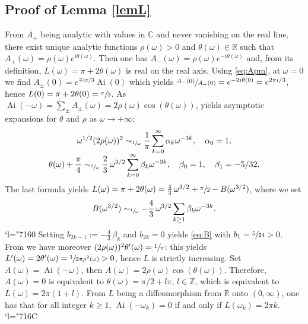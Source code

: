 \documentclass[11pt]{article}
\DeclareMathOperator{\Ai}{Ai}
\newcommand{\Changel}{\mathcode`l="7160}
\newcommand{\Changelback}{\mathcode`l="716C}
\theoremstyle{plain}
\theoremstyle{definition}
\begin{document}
\subsection{Proof of Lemma \ref{lemL}}
From $A_+$ being analytic with values in $\mathbb{C}$ and never vanishing on the real line, there exist unique analytic functions $\rho(\omega)>0$ and $\theta(\omega)\!\in\!\mathbb{R}$
such that $A_+(\omega)=\rho(\omega)e^{i\theta(\omega)}$. Then one has $A_-(\omega)=\rho(\omega)e^{-i\theta(\omega)}$ and, from its definition, $L(\omega)=\pi+2\theta(\omega)$ is real on the real axis.
Using \eqref{eq:Apm}, at $\omega=0$ we find $A_{\pm}(0)=e^{\mp i\pi/3}\Ai(0)$ which yields $\sfrac{A_-(0)}{A_+(0)}=e^{-2i\theta(0)}=e^{2\pi i/3}$, hence $L(0)=\pi+2\theta(0)=\sfrac{\pi}{3}$. As $\Ai(-\omega)=\sum_{\pm}A_{\pm}(\omega)=2\rho(\omega) \cos(\theta(\omega))$, \cite[(2.87), (2.104), (2.106)]{AFbook} yields asymptotic expansions for $\theta$ and $\rho$ as $\omega\to +\infty$:\vspace*{-3pt}\enlargethispage{\baselineskip}%
\begin{gather*}
\omega^{1/2}(2\rho(\omega))^2\sim_{\sfrac 1\omega} \frac{1}{\pi}\sum_{k=0}^{\infty}\alpha_k \omega^{-3k}, \quad \alpha_0=1,\\[
-5pt]
\theta(\omega)+\frac{\pi}{4}\sim_{\sfrac 1\omega} \frac 23\, \omega^{3/2}\sum_{k=0}^{\infty}\beta_k\omega^{-3k},\quad \beta_0=1,\quad \beta_1=-5/32.
\end{gather*}
The last formula yields $L(\omega)=\pi+2\theta(\omega)=\frac 43\, \omega^{3/2}+\sfrac{\pi}{2}-B(\omega^{3/2})$, where we set\vspace*{-5pt}
\[
B(\omega^{3/2})\sim_{\sfrac 1\omega}-\frac 43\,\omega^{3/2}\sum_{k\geq 1}\beta_k \omega^{-3k}.
\]
\Changel
Setting $b_{2k-1}:=-\frac 43\,\beta_k$ and $b_{2k}=0$ yields \eqref{eq:B} with $b_1=\sfrac{5}{24}>0$. From \cite[(2.95)]{AFbook} we have moreover $(2\rho(\omega))^2\theta'(\omega)=\sfrac{1}{\pi}$: this yields $L'(\omega)=2\theta'(\omega)=\sfrac{1}{2\pi\rho^2(\omega)}>0$,
hence $L$ is strictly increasing. Set $A(\omega)=\Ai(-\omega)$, then $A(\omega)=2\rho(\omega)\cos(\theta(\omega))$. Therefore, $A(\omega)=0$ is equivalent to $\theta(\omega)=\pi/2+l\pi$, $l\in \mathbb{Z}$, which is equivalent to $L(\omega)=2\pi(1+l)$. From $L$ being a diffeomorphism from $\mathbb{R}$ onto $(0,\infty)$, one has that for all integer $k\geq 1$, $\Ai(-\omega_k)=0$ if and only if $L(\omega_k)=2\pi k$.
\Changelback
\end{document}
